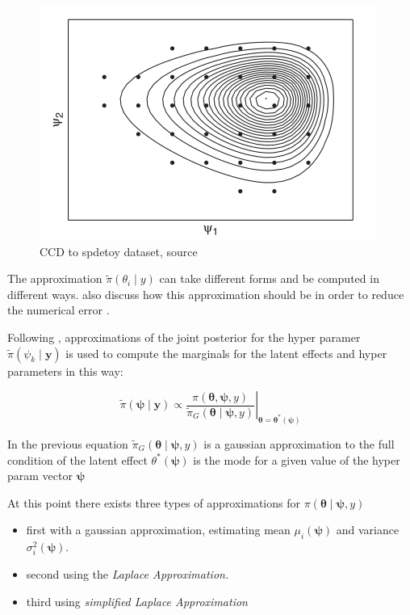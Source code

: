 \documentclass[
  12pt,
  a4paper,
  oneside]{book}
\providecommand{\tightlist}{%
  \setlength{\itemsep}{0pt}\setlength{\parskip}{0pt}}
\theoremstyle{definition}
\theoremstyle{definition}
\theoremstyle{definition}
\theoremstyle{remark}
\begin{document}
\begin{figure}
\centering
\includegraphics{images/CCDapplied.PNG}
\caption{CCD to spdetoy dataset, source \citet{Blangiardo-Cameletti}}
\end{figure}

The approximation \(\tilde{\pi}\left(\theta_{i} \mid y\right)\) can take different forms and be computed in different ways. \citet{Rue2009} also discuss how this approximation should be in order to reduce the numerical error \citep{Krainski-Rubio}.

Following \citet{Bayesian_INLA_Rubio}, approximations of the joint posterior for the hyper paramer \(\tilde\pi\left(\psi_{k} \mid \boldsymbol{y}\right)\) is used to compute the marginals for the latent effects and hyper parameters in this way:

\[
\left.\tilde{\pi}(\boldsymbol{\psi} \mid \mathbf{y}) \propto \frac{\pi(\boldsymbol{\theta}, \boldsymbol{\psi}, y)}{\tilde{\pi}_{G}(\boldsymbol{\theta} \mid \boldsymbol{\psi}, y)}\right|_{\boldsymbol{\theta}=\boldsymbol{\theta}^{*}(\boldsymbol{\psi})}
\]

In the previous equation \(\tilde{\pi}_{G}(\boldsymbol{\theta} \mid \boldsymbol{\psi}, y)\) is a gaussian approximation to the full condition of the latent effect \({\theta}^{*}(\boldsymbol{\psi})\) is the mode for a given value of the hyper param vector \(\boldsymbol{\psi}\)

At this point there exists three types of approximations for \(\pi\left(\boldsymbol{\theta} \mid \boldsymbol{\psi}, y\right)\)

\begin{itemize}
\tightlist
\item
  first with a gaussian approximation, estimating mean \(\mu_{i}(\boldsymbol{\psi})\) and variance \(\sigma_{i}^{2}(\boldsymbol{\psi})\).
\item
  second using the \emph{Laplace Approximation.}
\item
  third using \emph{simplified Laplace Approximation}
\end{itemize}
\end{document}
